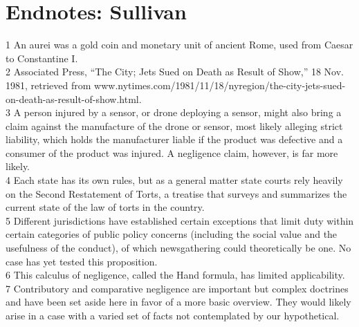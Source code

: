 \section{Endnotes: Sullivan}
1 An aurei was a gold coin and monetary unit of ancient Rome, used from Caesar to Constantine I.\\
2 Associated Press, ``The City; Jets Sued on Death as Result of Show,'' 18 Nov. 1981, retrieved from
www.nytimes.com/1981/11/18/nyregion/the-city-jets-sued-on-death-as-result-of-show.html.\\
3 A person injured by a sensor, or drone deploying a sensor, might also bring a claim against
the manufacture of the drone or sensor, most likely alleging strict liability, which holds the
manufacturer liable if the product was defective and a consumer of the product was injured.
A negligence claim, however, is far more likely.\\
4 Each state has its own rules, but as a general matter state courts rely heavily on the Second
Restatement of Torts, a treatise that surveys and summarizes the current state of the law of
torts in the country.\\
5 Different jurisdictions have established certain exceptions that limit duty within certain categories
of public policy concerns (including the social value and the usefulness of the conduct), of which
newsgathering could theoretically be one. No case has yet tested this proposition.\\
6 This calculus of negligence, called the Hand formula, has limited applicability.\\
7 Contributory and comparative negligence are important but complex doctrines and have been set
aside here in favor of a more basic overview. They would likely arise in a case with a varied set of
facts not contemplated by our hypothetical.\\


